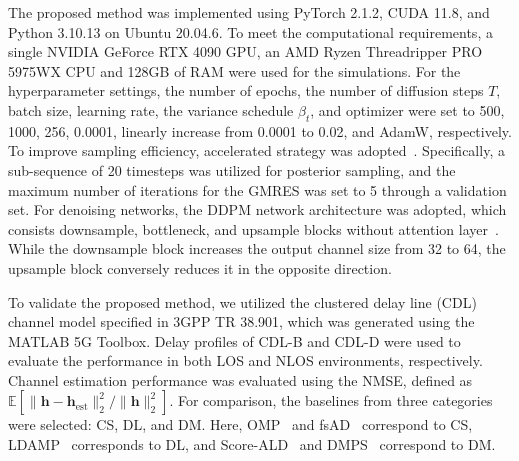 \documentclass[lettersize,journal]{IEEEtran}
\newcommand{\tred}{\textcolor{red}}
\begin{document}
The proposed method was implemented using PyTorch 2.1.2, CUDA 11.8, and Python 3.10.13 on Ubuntu 20.04.6. To meet the computational requirements, a single NVIDIA GeForce RTX 4090 GPU, an AMD Ryzen Threadripper PRO 5975WX CPU and 128GB of RAM were used for the simulations. For the hyperparameter settings, the number of epochs, the number of diffusion steps $T$, batch size, learning rate, the variance schedule $\beta_{t}$, and optimizer were set to 500, 1000, 256, 0.0001, linearly increase from 0.0001 to 0.02, and AdamW, respectively.
To improve sampling efficiency, accelerated strategy was adopted~\cite{songDenoisingDiffusionImplicit2020}. Specifically, a sub-sequence of 20 timesteps was utilized for posterior sampling, and the maximum number of iterations for the GMRES was set to 5 through a validation set. For denoising networks, the DDPM network architecture was adopted, which consists downsample, bottleneck, and upsample blocks without attention layer~\cite{hoDenoisingDiffusionProbabilistic2020}. While the downsample block increases the output channel size from 32 to 64, the upsample block conversely reduces it in the opposite direction.

To validate the proposed method, we utilized the clustered delay line (CDL)
channel model specified in 3GPP TR 38.901, which was generated using the MATLAB 5G Toolbox. Delay profiles of CDL-B and CDL-D were used to evaluate the performance in both LOS and NLOS environments, respectively. Channel estimation performance was evaluated using the NMSE, defined as $\mathbb{E}[\|\mathbf{h}-\mathbf{h}_{\text{est}}\|_{2}^{2} / \|\mathbf{h}\|_{2}^{2}]$. For comparison, the baselines from three categories were selected: CS, DL, and DM. Here, OMP~\cite{zhangAtomicNormDenoisingBased2018} and  fsAD~\cite{mendez-rialHybridMIMOArchitectures2016} correspond to CS, LDAMP~\cite{heDeepLearningBasedChannel2018} corresponds to DL, and Score-ALD~\cite{arvinteMIMOChannelEstimation2023} and DMPS~\cite{zhouGenerativeDiffusionModels2025} correspond to DM.

\end{document}
